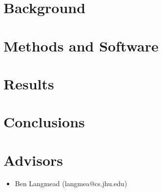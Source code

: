 \documentclass[11pt]{article}
\begin{document}
\section{Background}

\section{Methods and Software}

\section{Results}

\section{Conclusions}

\section{Advisors}
\begin{itemize}
	\item Ben Langmead (langmea@cs.jhu.edu)
\end{itemize}


\nocite{*}


\end{document}

